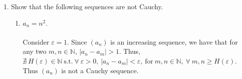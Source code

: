 \documentclass[12pt,letterpaper]{article}
\newcommand{\st}{\ \text{s.t.}\ }
\newcommand{\N}{\mathbb{N}}
\theoremstyle{case}
\theoremstyle{definition}
\newtheorem{lemma}[theorem]{Lemma}
\begin{document}
\begin{enumerate}
\begin{enumerate}
			\item Let $a_n$ satisfy $a_{n+1}=a_n^2$ for all $n \in \N$ where $0 < a_1 \leq 1/3$. Show $a_n$ is contractive.
			\\\\To begin, we want to show that $a_{n+1} < \frac{1}{3}$. We prove it by method of mathematical induction.
			\begin{lemma}
				\textbf{Basis Step:} Let $n=1$. Then we have that $a_1 < \frac{1}{3}$
				\\\\\textbf{Inductive Step:} Assume that $a_2 < \frac{1}{3}$ for arbitrary $n \in \N$.
				\\\\\textbf{Show:} We want to now show that $a_{n+1} < \frac{1}{3},\ \forall\ n \in \N$. So,
				\begin{align*}
					a_{n+1} &= a_n^2 < \left(\frac{1}{3}\right)^2 &\text{by definition of } a_{n+1} \\
					&= a_n^2 < \frac{1}{9} < \frac{1}{3}
				\end{align*}
				Thus, by mathematical induction, we have that $a_n < \frac{1}{3},\ \forall\ n \in \N$.
			\end{lemma}
			Now, we want to show that $a_n$ is contractive.
			\begin{proof}
				By the definition of a contractive sequence, we have the following:
				\begin{align*}
					|a_{n+2}-a_{n+1}| &= a_{n+1}^2-a_n^2| \\
					&= |a_{n+1}-a_n||a_{n+1}+a_n| \\
					&\leq |a_{n+1}-a_n|(|a_{n+1}|+|a_n|) \\
					&\leq \frac{2}{3}|a_{n+1}-a_n|
				\end{align*}
			So, if we let $C=\frac{2}{3}$, then we have shown that by the definition of a contractive sequence, $(a_n)$ is contractive.
			\end{proof}
		\end{enumerate}
	
		\item Show that the following sequences are not Cauchy.
		\begin{enumerate}
			\item $a_n=n^2$.
			\\\\Consider $\varepsilon=1$. Since $(a_n)$ is an increasing sequence, we have that for any two $m,n \in \N$, $|a_n-a_m| > 1$. Thus, $\nexists\ H(\varepsilon) \in \N \st \forall\ \varepsilon > 0,\ |a_n-a_m|<\varepsilon,\ \text{for}\ m,n\in \N,\ \forall\ m,n \geq H(\varepsilon)$. Thus $(a_n)$ is not a Cauchy sequence.\\
			

\end{enumerate}
\end{enumerate}
\end{document}
